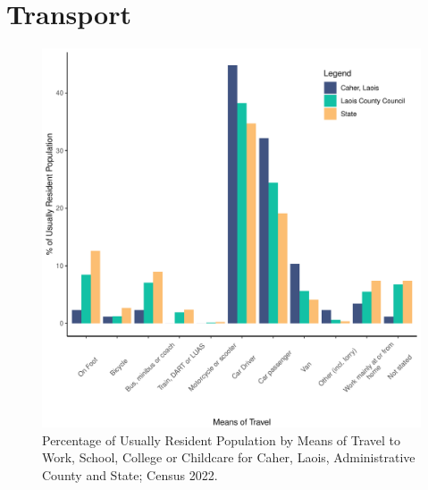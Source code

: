 \documentclass{article}
\begin{document}
\section{Transport}\label{sect:Trans}
\begin{figure}[H]
	\centering
	\includegraphics[width = 120mm]{../figures/TravelED.pdf}
	\caption{Percentage of Usually Resident Population by Means of Travel to Work, School, College or Childcare for Caher, Laois, Administrative County and State; Census 2022.}
	\label{fig:vbnv}
	\end{figure}
\end{document}
